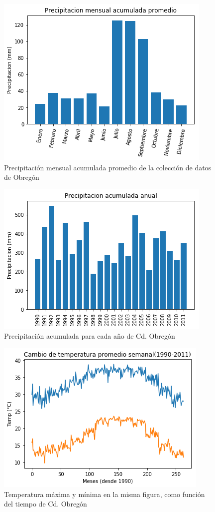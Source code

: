 \documentclass[12pt]{article}
\begin{document}
\begin{figure}
    \centering
    \includegraphics[scale=.8]{act1.png}
    \caption{Precipitación mensual acumulada promedio de la colección de datos de Obregón}
    \label{fig:act1}
\end{figure}
\begin{figure}
    \centering
    \includegraphics[scale=.8]{act2.png}
    \caption{Precipitación acumulada para cada año de Cd. Obregón}
    \label{fig:act2}
\end{figure}
\begin{figure}
    \centering
    \includegraphics[scale=.8]{act3.png}
    \caption{Temperatura máxima y mínima en la misma figura, como función del tiempo de Cd. Obregón}
    \label{fig:act3}
\end{figure}
\end{document}
